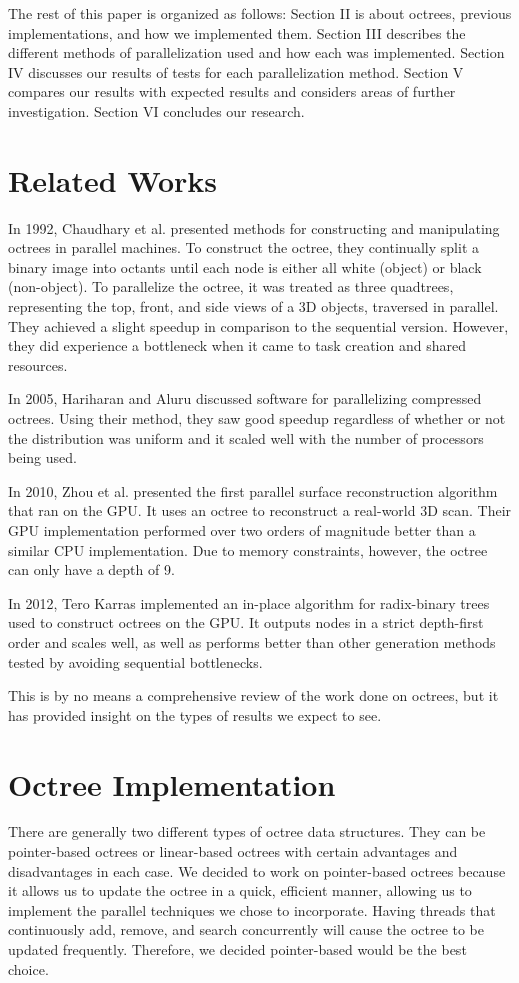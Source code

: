 \documentclass[conference]{IEEEtran}
\begin{document}
The rest of this paper is organized as follows: Section II is about octrees, previous implementations, and how we implemented them. Section III describes the different methods of parallelization used and how each was implemented. Section IV discusses our results of tests for each parallelization method. Section V compares our results with expected results and considers areas of further investigation. Section VI concludes our research.


\section{Related Works}
In 1992, Chaudhary et al. \cite{ChaudharyEtAl} presented methods for constructing and manipulating octrees in parallel machines. To construct the octree, they continually split a binary image into octants until each node is either all white (object) or black (non-object). To parallelize the octree, it was treated as three quadtrees, representing the top, front, and side views of a 3D objects,  traversed in parallel. They achieved a slight speedup in comparison to the sequential version. However, they did experience a bottleneck when it came to task creation and shared resources.

In 2005, Hariharan and Aluru \cite{HariharanSrinivas} discussed software for parallelizing compressed octrees. Using their method, they saw good speedup regardless of whether or not the distribution was uniform and it scaled well with the number of processors being used. 

In 2010, Zhou et al. \cite{ZhouEtAl} presented the first parallel surface reconstruction algorithm that ran on the GPU. It uses an octree to reconstruct a real-world 3D scan. Their GPU implementation performed over two orders of magnitude better than a similar CPU implementation. Due to memory constraints, however, the octree can only have a depth of 9. 

In 2012, Tero Karras \cite{Karras} implemented an in-place algorithm for radix-binary trees used to construct octrees on the GPU. It outputs nodes in a strict depth-first order and scales well, as well as performs better than other generation methods tested by avoiding sequential bottlenecks. 

This is by no means a comprehensive review of the work done on octrees, but it has provided insight on the types of results we expect to see. 

\section{Octree Implementation}
There are generally two different types of octree data structures. They can be pointer-based octrees or linear-based octrees with certain advantages and disadvantages in each case. We decided to work on pointer-based octrees because it allows us to update the octree in a quick, efficient manner, allowing us to implement the parallel techniques we chose to incorporate. Having threads that continuously add, remove, and search concurrently will cause the octree to be updated frequently. Therefore, we decided pointer-based would be the best choice.
\end{document}
